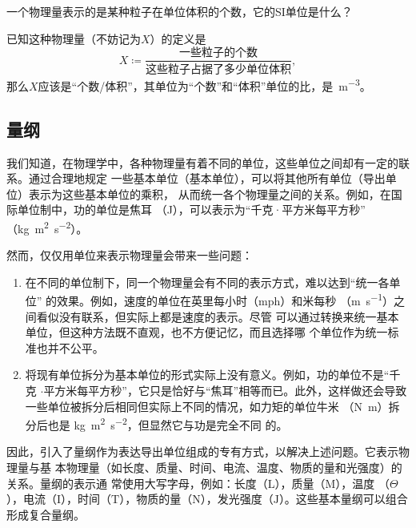 \begin{rawexp}\label{exp:particle_density_unit}
    一个物理量表示的是某种粒子在单位体积的个数，它的SI单位是什么？
\end{rawexp}

\begin{rawsol}
    已知这种物理量（不妨记为$X$）的定义是
    \[
        X \coloneq \frac{\text{一些粒子的个数}}{\text{这些粒子占据了多少单位体积}}
    ,\]
    那么$X$应该是“个数/体积”，其单位为“个数”和“体积”单位的比，是~\unit{\m^{-3}}。
\end{rawsol}

\subsection{量纲}

我们知道，在物理学中，各种物理量有着不同的单位，这些单位之间却有一定的联系。通过合理地规定
一些基本单位（基本单位），可以将其他所有单位（导出单位）表示为这些基本单位的乘积，
从而统一各个物理量之间的关系。例如，在国际单位制中，功的单位是焦耳
（\si{\joule}），可以表示为“千克·平方米每平方秒”
（\si{\kilogram\meter\squared\per\second\squared}）。

然而，仅仅用单位来表示物理量会带来一些问题：

\begin{enumerate}
    \item 在不同的单位制下，同一个物理量会有不同的表示方式，难以达到“统一各单位”
        的效果。例如，速度的单位在英里每小时（mph）和米每秒
        （\si{\meter\per\second}）之间看似没有联系，但实际上都是速度的表示。尽管
        可以通过转换来统一基本单位，但这种方法既不直观，也不方便记忆，而且选择哪
        个单位作为统一标准也并不公平。
    
    \item 将现有单位拆分为基本单位的形式实际上没有意义。例如，功的单位不是“千克
        $\cdot$平方米每平方秒”，它只是恰好与“焦耳”相等而已。此外，这样做还会导致
        一些单位被拆分后相同但实际上不同的情况，如力矩的单位牛米
        （\si{\newton\meter}）拆分后也是
        \si{\kilogram\meter\squared\per\second\squared}，但显然它与功是完全不同
        的。
\end{enumerate}



因此，引入了量纲作为表达导出单位组成的专有方式，以解决上述问题。它表示物理量与基
本物理量（如长度、质量、时间、电流、温度、物质的量和光强度）的关系。量纲的表示通
常使用大写字母，例如：长度（$\mathrm {L} $），质量（$\mathrm {M} $），温度
（$\Theta$），电流（$\mathrm {I} $），时间（$\mathrm{T}$），物质的量（$\mathrm 
{N} $），发光强度（$\mathrm {J} $）。这些基本量纲可以组合形成复合量纲。

